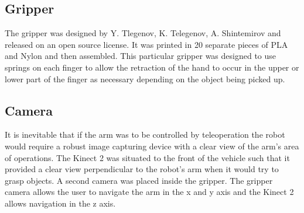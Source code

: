 \subsection{Gripper}
The gripper was designed by Y. Tlegenov, K. Telegenov, A. Shintemirov and released on an open source license. It was printed in 20 separate pieces of PLA and Nylon and then assembled.
This particular gripper was designed to use springs on each finger to allow the retraction of the hand to occur in the upper or lower part of the finger as necessary depending on the object being picked up.


\subsection{Camera}
It is inevitable that if the arm was to be controlled by teleoperation the robot would require a robust image capturing device with a clear view of the arm's area of operations. The Kinect 2 was situated to the front of the vehicle such that it provided a clear view perpendicular to the robot’s arm when it would try to grasp objects. A second camera was placed inside the gripper. The gripper camera allows the user to navigate the arm in the x and y axis and the Kinect 2 allows navigation in the z axis. 

